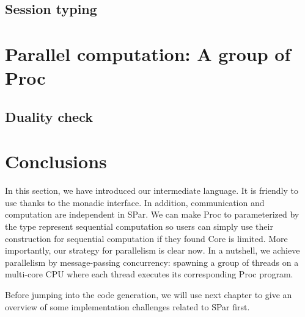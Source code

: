 \subsection{Session typing}
\section{Parallel computation: A group of Proc}
\subsection{Duality check}
\section{Conclusions}
In this section, we have introduced our intermediate language. It is friendly to use thanks to the monadic interface. In addition, communication and computation are independent in SPar. We can make Proc to parameterized by the type represent sequential computation so users can simply use their construction for sequential computation if they found Core is limited. More importantly, our strategy for parallelism is clear now. In a nutshell, we achieve parallelism by message-passing concurrency: spawning a group of threads on a multi-core CPU where each thread executes its corresponding Proc program.

Before jumping into the code generation, we will use next chapter to give an overview of some implementation challenges related to SPar first.
